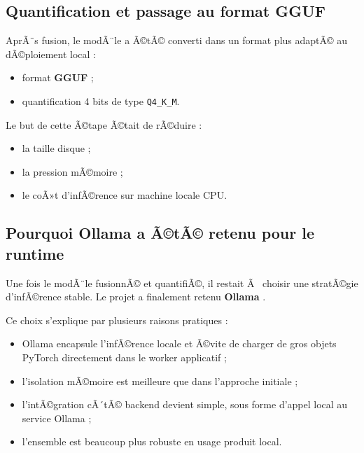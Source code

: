 ﻿\documentclass[12pt,a4paper]{article}
\begin{document}
\subsection{Quantification et passage au format GGUF}
AprÃ¨s fusion, le modÃ¨le a Ã©tÃ© converti dans un format plus adaptÃ© au dÃ©ploiement local :
\begin{itemize}
    \item format \textbf{GGUF} ;
    \item quantification 4 bits de type \texttt{Q4\_K\_M}.
\end{itemize}

Le but de cette Ã©tape Ã©tait de rÃ©duire :
\begin{itemize}
    \item la taille disque ;
    \item la pression mÃ©moire ;
    \item le coÃ»t d'infÃ©rence sur machine locale CPU.
\end{itemize}

\subsection{Pourquoi Ollama a Ã©tÃ© retenu pour le runtime}
Une fois le modÃ¨le fusionnÃ© et quantifiÃ©, il restait Ã  choisir une stratÃ©gie d'infÃ©rence stable. Le projet a finalement retenu \textbf{Ollama} \cite{ollama}.

Ce choix s'explique par plusieurs raisons pratiques :
\begin{itemize}
    \item Ollama encapsule l'infÃ©rence locale et Ã©vite de charger de gros objets PyTorch directement dans le worker applicatif ;
    \item l'isolation mÃ©moire est meilleure que dans l'approche initiale ;
    \item l'intÃ©gration cÃ´tÃ© backend devient simple, sous forme d'appel local au service Ollama ;
    \item l'ensemble est beaucoup plus robuste en usage produit local.
\end{itemize}
\end{document}
